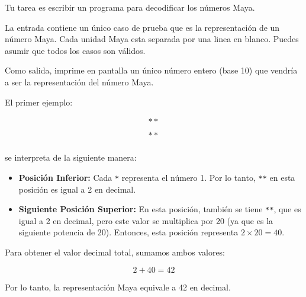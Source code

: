 Tu tarea es escribir un programa para decodificar los n\'umeros Maya.


La entrada contiene un \'unico caso de prueba que es la representaci\'on de un n\'umero Maya. Cada unidad Maya esta separada por una linea en blanco. Puedes asumir que todos los casos son v\'alidos.

\outputText

Como salida, imprime en pantalla un \'unico n\'umero entero (base 10) que vendr\'ia a ser la representaci\'on del n\'umero Maya.

\exampleCases

\begin{example}
\end{example}

\explanationText

El primer ejemplo:

\[
\begin{array}{c}
** \\
\\
** \\
\end{array}
\]

se interpreta de la siguiente manera:

\begin{itemize}
    \item \textbf{Posición Inferior:} Cada \texttt{*} representa el número 1. Por lo tanto, \texttt{**} en esta posición es igual a 2 en decimal.
    \item \textbf{Siguiente Posición Superior:} En esta posición, también se tiene \texttt{**}, que es igual a 2 en decimal, pero este valor se multiplica por 20 (ya que es la siguiente potencia de 20). Entonces, esta posición representa $2 \times 20 = 40$.
\end{itemize}

Para obtener el valor decimal total, sumamos ambos valores:

\[
2 + 40 = 42
\]

Por lo tanto, la representación Maya equivale a 42 en decimal.

